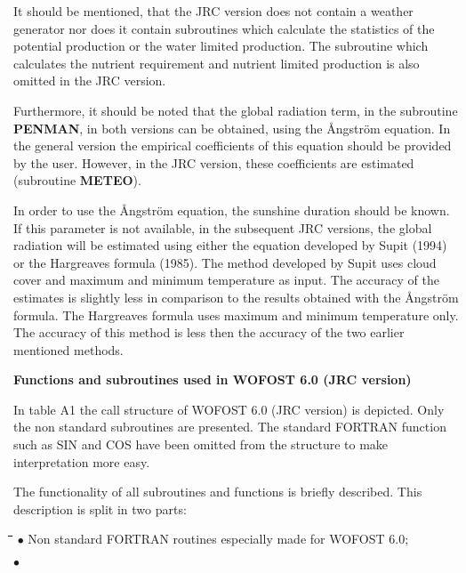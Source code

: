 \documentclass[11pt]{article}
\begin{document}
It should be mentioned, that the JRC version does not contain a weather generator nor
does it contain subrou\-tines which calculate the statistics of the potential produc\-tion or the
water limited production. The subroutine which calculates the nutrient requirement and
nutrient limited production is also omitted in the JRC version.

Furthermore, it should be noted that the global radiation term, in the subroutine {\bf PEN\-MAN}, in both versions can be obtained, using the \AA ngstr\"{o}m equation. In the general
version the empirical coefficients of this equation should be provided by the user.
However, in the JRC version, these coefficients are estimated (subroutine {\bf METEO}). 

In order to use the \AA ngstr\"{o}m equation, the sunshine duration should be known. If this
parame\-ter is not available, in the subsequent JRC versions, the global radiation will be
estimated using either the equation developed by Supit (1994) or the Hargreaves formula
(1985). The method developed by Supit uses cloud cover and maximum and minimum
temperature as input. The accuracy of the estimates is slightly less in comparison to the
results obtained with the \AA ngstr\"{o}m formula. The Hargreaves formula uses maximum and
minimum temperature only. The accuracy of this method is less then the accuracy of the
two earlier mentioned methods.

\bigskip
{\large {\bf Functions and subroutines used in WOFOST 6.0 (JRC version)}}

In table A1 the call structure of WOFOST 6.0 (JRC version) is depicted. Only the non
standard subroutines are presented. The standard FORTRAN function such as SIN and
COS have been omitted from the structure to make interpretation more easy. 

The functionality of all subroutines and functions is briefly described. This description is
split in two parts:\nwln
\begin{tabbing}
\hspace{1.27cm}\=\hspace{1.27cm}\=\hspace{1.27cm}\=\hspace{1.27cm}\=%
\hspace{1.27cm}\=\hspace{1.27cm}\=\hspace{1.27cm}\=\hspace{1.27cm}\=%
\hspace{1.27cm}\=\hspace{1.27cm}\=\kill
$\bullet$\> Non standard FORTRAN routines especially made for WOFOST 6.0;
\end{tabbing}
$\bullet$ 
\testlastline
\end{document}
